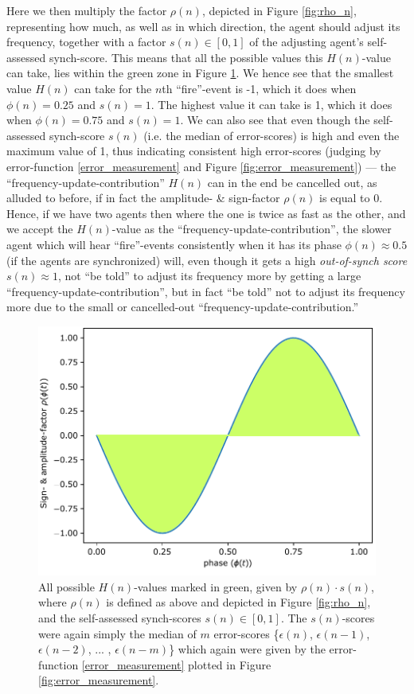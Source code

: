 	Here we then multiply the factor $\rho(n)$, depicted in Figure \ref{fig:rho_n}, representing how much, as well as in which direction, the agent should adjust its frequency, together with a factor $s(n) \in [0,1]$ of the adjusting agent's self-assessed synch-score. This means that all the possible values this $H(n)$-value can take, lies within the green zone in Figure \ref{fig:all_possible_H_n_values}. We hence see that the smallest value $H(n)$ can take for the $n$th ``fire''-event is -1, which it does when $\phi(n) = 0.25$ and $s(n) = 1$. The highest value it can take is 1, which it does when $\phi(n) = 0.75$ and $s(n) = 1$. We can also see that even though the self-assessed synch-score $s(n)$ (i.e. the median of error-scores) is high and even the maximum value of 1, thus indicating consistent high error-scores (judging by error-function \eqref{error_measurement} and Figure \ref{fig:error_measurement}) — the ``frequency-update-contribution'' $H(n)$ can in the end be cancelled out, as alluded to before, if in fact the amplitude- \& sign-factor $\rho(n)$ is equal to 0. Hence, if we have two agents then where the one is twice as fast as the other, and we accept the $H(n)$-value as the ``frequency-update-contribution'', the slower agent which will hear ``fire''-events consistently when it has its phase $\phi(n) \approx 0.5$ (if the agents are synchronized) will, even though it gets a high \textit{out-of-synch score} $s(n) \approx 1$, not ``be told'' to adjust its frequency more by getting a large ``frequency-update-contribution'', but in fact ``be told'' not to adjust its frequency more due to the small or cancelled-out ``frequency-update-contribution.''
	
	\begin{figure}[h]
		\centering
		\includegraphics[width=0.9\linewidth]{Assets/Figures/all_possible_H_n_values.pdf}
		\caption{All possible $H(n)$-values marked in green, given by $\rho(n) \cdot s(n)$, where $\rho(n)$ is defined as above and depicted in Figure \ref{fig:rho_n}, and the self-assessed synch-scores $s(n) \in [0, 1]$. The $s(n)$-scores were again simply the median of $m$ error-scores \{$\epsilon(n)$, $\epsilon(n-1)$, $\epsilon(n-2)$, ... , $\epsilon(n-m)$\} which again were given by the error-function \eqref{error_measurement} plotted in Figure \ref{fig:error_measurement}.}
		\label{fig:all_possible_H_n_values}
	\end{figure}
	
